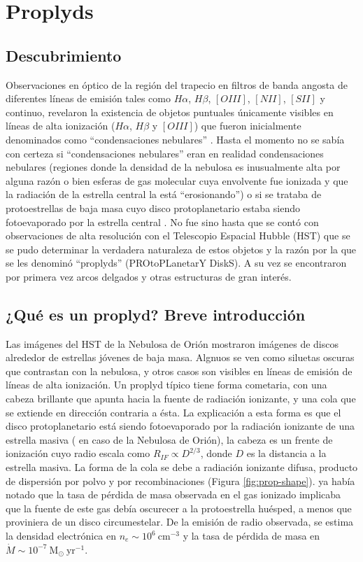 \section{Proplyds}
\subsection{Descubrimiento}
Observaciones en óptico de la región del trapecio en filtros de banda angosta de diferentes líneas de emisión tales como $H\alpha$, $H\beta$, $[OIII]$, $[NII]$, $[SII]$ y continuo, revelaron la existencia de objetos puntuales únicamente visibles en líneas de alta ionización ($H\alpha$, $H\beta$ y $[OIII]$) que fueron inicialmente denominados como ``condensaciones nebulares'' \citep{Laques:1979}. Hasta el momento no se sabía con certeza si ``condensaciones nebulares'' eran en realidad condensaciones nebulares (regiones donde la densidad de la nebulosa es inusualmente alta por alguna razón o bien esferas de gas molecular cuya envolvente fue ionizada y que la radiación de la estrella central la está ``erosionando'') o si se trataba de protoestrellas de baja masa cuyo disco protoplanetario estaba siendo fotoevaporado por la estrella central \citep{churchwell:1987}. No fue sino hasta que se contó con observaciones de alta resolución con el Telescopio Espacial Hubble (HST) que se se pudo determinar la verdadera naturaleza de estos objetos \citep{ODell:1993} y la razón por la que se les denominó ``proplyds'' (PROtoPLanetarY DiskS). A su vez se encontraron por primera vez arcos delgados y otras estructuras de gran interés.

\subsection{¿Qué es un proplyd? Breve introducción \citep{Johnstone:1998}}

Las imágenes del HST de la Nebulosa de Orión mostraron imágenes de discos alrededor de estrellas jóvenes de baja masa. Algnuos se ven como siluetas oscuras que contrastan con la nebulosa, y otros casos son visibles en líneas de emisión de líneas de alta ionización. Un proplyd típico tiene forma cometaria, con una cabeza brillante que apunta hacia la fuente de radiación ionizante, y una cola que se extiende en dirección contraria a ésta. La explicación a esta forma es que el disco protoplanetario está siendo fotoevaporado por la radiación ionizante de una estrella masiva (\thC{} en caso de la Nebulosa de Orión), la cabeza es un frente de ionización cuyo radio escala como $R_{IF} \propto D^{2/3}$, donde $D$ es la distancia a la estrella masiva. La forma de la cola se debe a radiación ionizante difusa, producto de dispersión por polvo y por recombinaciones (Figura \ref{fig:prop-shape}). \citet{churchwell:1987} ya había notado que la tasa de pérdida de masa observada
en el gas ionizado implicaba que la fuente de este gas debía oscurecer a la protoestrella huésped, a menos que proviniera de un disco circumestelar. De la
emisión de radio observada, se estima la densidad electrónica en $n_e \sim 10^6~\mathrm{cm^{-3}}$ y la tasa de pérdida de masa en $\dot{M} \sim 10^{-7}~\mathrm{M_\odot~yr^{-1}}$.

